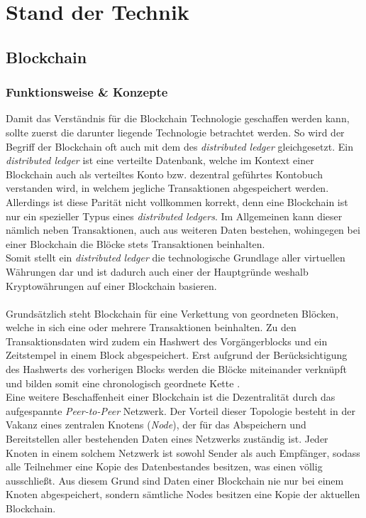 \chapter{Stand der Technik}
\label{kap:Kapitel02}
%
       
%
\section{Blockchain}
\subsection{Funktionsweise \& Konzepte}
Damit das Verständnis für die Blockchain Technologie geschaffen werden kann, sollte zuerst die darunter liegende Technologie betrachtet werden. 
So wird der Begriff der Blockchain oft auch mit dem des \textit{distributed ledger} gleichgesetzt. Ein \textit{distributed ledger} ist eine verteilte Datenbank, welche im Kontext einer Blockchain auch als verteiltes Konto bzw. dezentral geführtes Kontobuch \cite{DL:bafin} verstanden wird, in welchem jegliche Transaktionen abgespeichert werden.\\
Allerdings ist diese Pa­ri­tät nicht vollkommen korrekt, denn eine Blockchain ist nur ein spezieller Typus eines \textit{distributed ledgers}. Im Allgemeinen kann dieser nämlich neben Transaktionen, auch aus weiteren Daten bestehen, wohingegen bei einer Blockchain die Blöcke stets Transaktionen beinhalten. \\
Somit stellt ein \textit{distributed ledger} die technologische Grundlage aller virtuellen Währungen dar und ist dadurch auch einer der Hauptgründe weshalb Kryptowährungen auf einer Blockchain basieren.\\\\
Grundsätzlich steht Blockchain für eine Verkettung von geordneten Blöcken, welche in sich eine oder mehrere Transaktionen beinhalten. 
Zu den Transaktionsdaten wird zudem ein Hashwert des Vorgängerblocks und ein Zeitstempel in einem Block abgespeichert. Erst aufgrund der Berücksichtigung des Hashwerts des vorherigen Blocks werden die Blöcke miteinander verknüpft und bilden somit eine chronologisch geordnete Kette \cite{MasteringBlockchain}.\\
Eine weitere Beschaffenheit einer Blockchain ist die Dezentralität durch das aufgespannte \textit{Peer-to-Peer} Netzwerk. Der Vorteil dieser Topologie besteht in der Vakanz eines zentralen Knotens (\textit{Node}), der für das Abspeichern und Bereitstellen aller bestehenden Daten eines Netzwerks zuständig ist. Jeder Knoten in einem solchem Netzwerk ist sowohl Sender als auch Empfänger, sodass alle Teilnehmer eine Kopie des Datenbestandes besitzen, was einen  völlig ausschließt. Aus diesem Grund sind Daten einer Blockchain nie nur bei einem Knoten abgespeichert, sondern sämtliche Nodes besitzen eine Kopie der aktuellen Blockchain.\\\\
